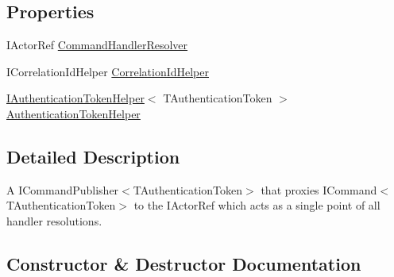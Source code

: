 \subsection*{Properties}
\begin{DoxyCompactItemize}
\item 
I\+Actor\+Ref \hyperlink{classCqrs_1_1Akka_1_1Commands_1_1AkkaCommandBusProxy_afab0340ffb172da48584dce148f3defd}{Command\+Handler\+Resolver}
\item 
I\+Correlation\+Id\+Helper \hyperlink{classCqrs_1_1Akka_1_1Commands_1_1AkkaCommandBusProxy_aa554035c12060c7eedb0b982ac490da8}{Correlation\+Id\+Helper}
\item 
\hyperlink{interfaceCqrs_1_1Authentication_1_1IAuthenticationTokenHelper}{I\+Authentication\+Token\+Helper}$<$ T\+Authentication\+Token $>$ \hyperlink{classCqrs_1_1Akka_1_1Commands_1_1AkkaCommandBusProxy_a6faae6227f1da33928e54a775466f9c9}{Authentication\+Token\+Helper}
\end{DoxyCompactItemize}


\subsection{Detailed Description}
A I\+Command\+Publisher$<$\+T\+Authentication\+Token$>$ that proxies I\+Command$<$\+T\+Authentication\+Token$>$ to the I\+Actor\+Ref which acts as a single point of all handler resolutions. 



\subsection{Constructor \& Destructor Documentation}
\mbox{\label{classCqrs_1_1Akka_1_1Commands_1_1AkkaCommandBusProxy_ad9a3fa7aa546bc2c398d4f52d0659656}} 
